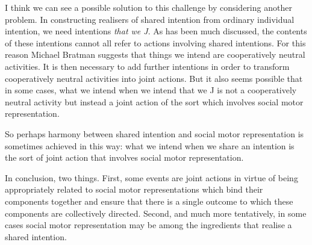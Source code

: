 \documentclass[12pt,\papersize]{extarticle}
\begin{document}
I think we can see a possible solution to this challenge by considering another problem.
In constructing realisers of shared intention from ordinary individual intention, we need intentions \emph{that we J}.
As has been much discussed, the contents of these intentions cannot all refer to actions involving shared intentions.
For this reason Michael Bratman suggests that things we intend are  cooperatively neutral activities.
It is then necessary to add further intentions in order to transform cooperatively neutral activities into joint actions.
But it also seems possible that in some cases, what we intend when we intend that we J is not a cooperatively neutral activity but instead a joint action of the sort which involves social motor representation.

So perhaps harmony between shared intention and social motor representation is sometimes achieved in this way: what we intend when we share an intention is the sort of joint action that involves social motor representation.

In conclusion, two things.
First, some events are joint actions in virtue of being appropriately related to social motor representations which bind their components together and ensure that there is a single outcome to which these components are collectively directed.
Second, and much more tentatively, in some cases social motor representation may be among the ingredients that realise a shared intention.



\end{document}
